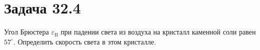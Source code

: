 \section{Задача 32.4}

Угол Брюстера $\varepsilon_\text{B} $ при падении света из воздуха на кристалл каменной соли равен $57^\circ$. Определить скорость света в этом кристалле.